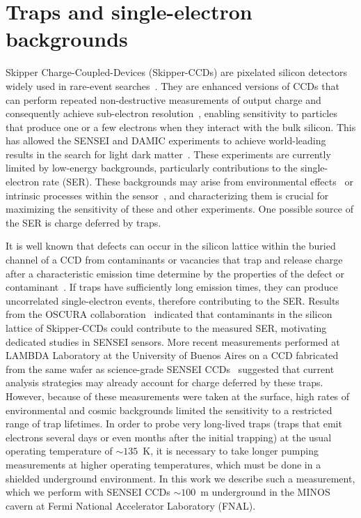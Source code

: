 \documentclass[aps, prapplied,twocolumn,showpacs,superscriptaddress,preprintnumbers, longbibliography,nofootinbib,floatfix]{revtex4-2}
\begin{document}
\section{Traps and single-electron backgrounds}\label{sec:intro}
Skipper Charge-Coupled-Devices (Skipper-CCDs) are pixelated silicon detectors widely used in rare-event searches~\cite{Smith2010, Holland:2003, Janesick1990,Wen1974}. 
They are enhanced versions of CCDs that can perform repeated non-destructive measurements of output charge and consequently achieve sub-electron resolution~\cite{Tiffenberg:2017aac}, enabling sensitivity to particles that produce one or a few electrons when they interact with the bulk silicon.
This has allowed the SENSEI and DAMIC experiments to achieve world-leading results in the search for light dark matter~\cite{Abramoff:2019dfb, Sensei2020, SENSEI:2023zdf,DAMIC-M:2023gxo,aguilar2022oscura,DAMIC-M:2025luv}. 
These experiments are currently limited by low-energy backgrounds, particularly contributions to the single-electron rate (SER). 
These backgrounds may arise from environmental effects~\cite{Du_2022,Du:2023soy,Sensei2020,SENSEI:2023zdf,SENSEI:2024yyt} or intrinsic processes within the sensor~\cite{senseiSEE,ampLight}, and characterizing them is crucial for maximizing the sensitivity of these and other experiments. 
One possible source of the SER is charge deferred by traps. 

It is well known that defects can occur in the silicon lattice within the buried channel of a CCD from contaminants or vacancies that trap and release charge after a characteristic emission time determine by the properties of the defect or contaminant~\cite{claeys_metal_2018,pichler_intrinsic_2004,chroneos_oxygen_2015,wang_phosphorousvacancyoxygen_2013,collins_properties_1957,pintiliea_radiation_2009}. 
If traps have sufficiently long emission times, they can produce uncorrelated single-electron events, therefore contributing to the SER. 
Results from the OSCURA collaboration~\cite{oscurasensors, trapsOscura} indicated that contaminants in the silicon lattice of Skipper-CCDs could contribute to the measured SER, motivating dedicated studies in SENSEI sensors. 
More recent measurements performed at LAMBDA Laboratory at the University of Buenos Aires on a CCD fabricated from the same wafer as science-grade SENSEI CCDs~\cite{Brusco:2025kus} suggested that current analysis strategies may already account for charge deferred by these traps. 
However, because of these measurements were taken at the surface, high rates of environmental and cosmic backgrounds limited the sensitivity to a restricted range of trap lifetimes. 
In order to probe very long-lived traps (traps that emit electrons several days or even months after the initial trapping) at the usual operating temperature of $\sim135$~K, it is necessary to take longer pumping measurements at higher operating temperatures, which must be done in a shielded underground environment. 
In this work we describe such a measurement, which we perform with SENSEI CCDs $\sim100$~m underground in the MINOS cavern at Fermi National Accelerator Laboratory (FNAL).
\end{document}
